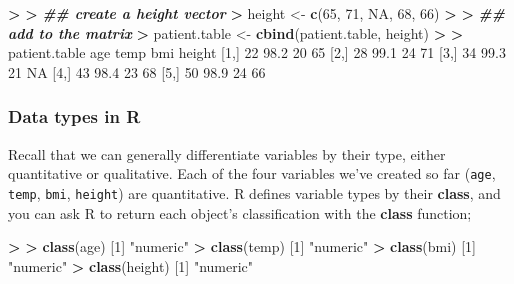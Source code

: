 \documentclass[
]{book}
\newenvironment{Shaded}{\begin{snugshade}}{\end{snugshade}}
\newcommand{\ConstantTok}[1]{\textcolor[rgb]{0.56,0.35,0.01}{#1}}
\newcommand{\DecValTok}[1]{\textcolor[rgb]{0.00,0.00,0.81}{#1}}
\newcommand{\DocumentationTok}[1]{\textcolor[rgb]{0.56,0.35,0.01}{\textbf{\textit{#1}}}}
\newcommand{\ErrorTok}[1]{\textcolor[rgb]{0.64,0.00,0.00}{\textbf{#1}}}
\newcommand{\FloatTok}[1]{\textcolor[rgb]{0.00,0.00,0.81}{#1}}
\newcommand{\FunctionTok}[1]{\textcolor[rgb]{0.13,0.29,0.53}{\textbf{#1}}}
\newcommand{\NormalTok}[1]{#1}
\newcommand{\OtherTok}[1]{\textcolor[rgb]{0.56,0.35,0.01}{#1}}
\newcommand{\SpecialCharTok}[1]{\textcolor[rgb]{0.81,0.36,0.00}{\textbf{#1}}}
\newcommand{\StringTok}[1]{\textcolor[rgb]{0.31,0.60,0.02}{#1}}
\begin{document}
\begin{Shaded}
\begin{Highlighting}[]
\SpecialCharTok{\textgreater{}} 
\ErrorTok{\textgreater{}} \DocumentationTok{\#\# create a height vector}
\ErrorTok{\textgreater{}}\NormalTok{ height }\OtherTok{\textless{}{-}} \FunctionTok{c}\NormalTok{(}\DecValTok{65}\NormalTok{, }\DecValTok{71}\NormalTok{, }\ConstantTok{NA}\NormalTok{, }\DecValTok{68}\NormalTok{, }\DecValTok{66}\NormalTok{)}
\SpecialCharTok{\textgreater{}} 
\ErrorTok{\textgreater{}} \DocumentationTok{\#\# add to the matrix}
\ErrorTok{\textgreater{}}\NormalTok{ patient.table }\OtherTok{\textless{}{-}} \FunctionTok{cbind}\NormalTok{(patient.table, height)}
\SpecialCharTok{\textgreater{}} 
\ErrorTok{\textgreater{}}\NormalTok{ patient.table}
\NormalTok{     age temp bmi height}
\NormalTok{[}\DecValTok{1}\NormalTok{,]  }\DecValTok{22} \FloatTok{98.2}  \DecValTok{20}     \DecValTok{65}
\NormalTok{[}\DecValTok{2}\NormalTok{,]  }\DecValTok{28} \FloatTok{99.1}  \DecValTok{24}     \DecValTok{71}
\NormalTok{[}\DecValTok{3}\NormalTok{,]  }\DecValTok{34} \FloatTok{99.3}  \DecValTok{21}     \ConstantTok{NA}
\NormalTok{[}\DecValTok{4}\NormalTok{,]  }\DecValTok{43} \FloatTok{98.4}  \DecValTok{23}     \DecValTok{68}
\NormalTok{[}\DecValTok{5}\NormalTok{,]  }\DecValTok{50} \FloatTok{98.9}  \DecValTok{24}     \DecValTok{66}
\end{Highlighting}
\end{Shaded}

\subsubsection{Data types in R}\label{data-types-in-r}

Recall that we can generally differentiate variables by their type, either quantitative or qualitative. Each of the four variables we've created so far (\texttt{age}, \texttt{temp}, \texttt{bmi}, \texttt{height}) are quantitative. R defines variable types by their \textbf{class}, and you can ask R to return each object's classification with the \textbf{class} function;

\begin{Shaded}
\begin{Highlighting}[]
\SpecialCharTok{\textgreater{}} 
\ErrorTok{\textgreater{}} \FunctionTok{class}\NormalTok{(age)}
\NormalTok{[}\DecValTok{1}\NormalTok{] }\StringTok{"numeric"}
\SpecialCharTok{\textgreater{}} \FunctionTok{class}\NormalTok{(temp)}
\NormalTok{[}\DecValTok{1}\NormalTok{] }\StringTok{"numeric"}
\SpecialCharTok{\textgreater{}} \FunctionTok{class}\NormalTok{(bmi)}
\NormalTok{[}\DecValTok{1}\NormalTok{] }\StringTok{"numeric"}
\SpecialCharTok{\textgreater{}} \FunctionTok{class}\NormalTok{(height)}
\NormalTok{[}\DecValTok{1}\NormalTok{] }\StringTok{"numeric"}
\end{Highlighting}
\end{Shaded}
\end{document}
